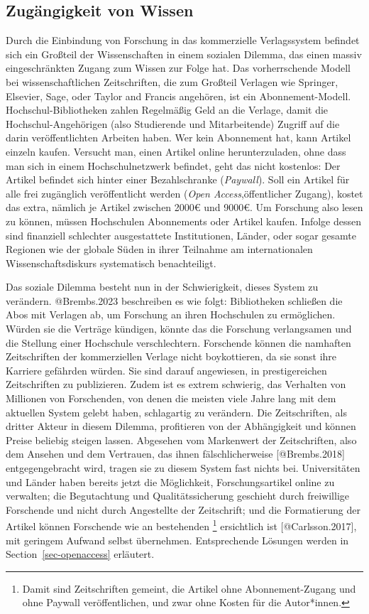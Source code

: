 \documentclass[
  letterpaper,
  DIV=11,
  numbers=noendperiod]{scrreprt}
\begin{document}
\subsection{Zugängigkeit von Wissen}\label{zuguxe4ngigkeit-von-wissen}

Durch die Einbindung von Forschung in das kommerzielle Verlagssystem
befindet sich ein Großteil der Wissenschaften in einem sozialen Dilemma,
das einen massiv eingeschränkten Zugang zum Wissen zur Folge hat. Das
vorherrschende Modell bei wissenschaftlichen Zeitschriften, die zum
Großteil Verlagen wie Springer, Elsevier, Sage, oder Taylor and Francis
angehören, ist ein Abonnement-Modell. Hochschul-Bibliotheken zahlen
Regelmäßig Geld an die Verlage, damit die Hochschul-Angehörigen (also
Studierende und Mitarbeitende) Zugriff auf die darin veröffentlichten
Arbeiten haben. Wer kein Abonnement hat, kann Artikel einzeln kaufen.
Versucht man, einen Artikel online herunterzuladen, ohne dass man sich
in einem Hochschulnetzwerk befindet, geht das nicht kostenlos: Der
Artikel befindet sich hinter einer Bezahlschranke (\emph{Paywall}). Soll
ein Artikel für alle frei zugänglich veröffentlicht werden (\emph{Open
Access},öffentlicher Zugang), kostet das extra, nämlich je Artikel
zwischen 2000€ und 9000€. Um Forschung also lesen zu können, müssen
Hochschulen Abonnements oder Artikel kaufen. Infolge dessen sind
finanziell schlechter ausgestattete Institutionen, Länder, oder sogar
gesamte Regionen wie der globale Süden in ihrer Teilnahme am
internationalen Wissenschaftsdiskurs systematisch benachteiligt.

Das soziale Dilemma besteht nun in der Schwierigkeit, dieses System zu
verändern. @Brembs.2023 beschreiben es wie folgt: Bibliotheken schließen
die Abos mit Verlagen ab, um Forschung an ihren Hochschulen zu
ermöglichen. Würden sie die Verträge kündigen, könnte das die Forschung
verlangsamen und die Stellung einer Hochschule verschlechtern.
Forschende können die namhaften Zeitschriften der kommerziellen Verlage
nicht boykottieren, da sie sonst ihre Karriere gefährden würden. Sie
sind darauf angewiesen, in prestigereichen Zeitschriften zu publizieren.
Zudem ist es extrem schwierig, das Verhalten von Millionen von
Forschenden, von denen die meisten viele Jahre lang mit dem aktuellen
System gelebt haben, schlagartig zu verändern. Die Zeitschriften, als
dritter Akteur in diesem Dilemma, profitieren von der Abhängigkeit und
können Preise beliebig steigen lassen. Abgesehen vom Markenwert der
Zeitschriften, also dem Ansehen und dem Vertrauen, das ihnen
fälschlicherweise {[}@Brembs.2018{]} entgegengebracht wird, tragen sie
zu diesem System fast nichts bei. Universitäten und Länder haben bereits
jetzt die Möglichkeit, Forschungsartikel online zu verwalten; die
Begutachtung und Qualitätssicherung geschieht durch freiwillige
Forschende und nicht durch Angestellte der Zeitschrift; und die
Formatierung der Artikel können Forschende wie an bestehenden
\footnote{Damit sind Zeitschriften gemeint, die Artikel ohne
  Abonnement-Zugang und ohne Paywall veröffentlichen, und zwar ohne
  Kosten für die Autor*innen.} ersichtlich ist {[}@Carlsson.2017{]}, mit
geringem Aufwand selbst übernehmen. Entsprechende Lösungen werden in
Section~\ref{sec-openaccess} erläutert.
\end{document}

